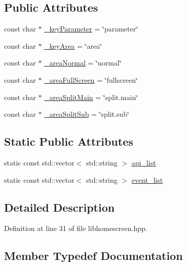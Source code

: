 \subsection*{Public Attributes}
\begin{DoxyCompactItemize}
\item 
const char $\ast$ \hyperlink{class_lib_home_screen_a927592eff8e34efbbceaf12522f8897f}{\+\_\+key\+Parameter} = \char`\"{}parameter\char`\"{}
\item 
const char $\ast$ \hyperlink{class_lib_home_screen_a8becda1b035ae45f5a11c7e7963091bf}{\+\_\+key\+Area} = \char`\"{}area\char`\"{}
\item 
const char $\ast$ \hyperlink{class_lib_home_screen_aac718b60b83c74e2b061f6f7f7ec3bf5}{\+\_\+area\+Normal} = \char`\"{}normal\char`\"{}
\item 
const char $\ast$ \hyperlink{class_lib_home_screen_ad0569f5323ead77a43bd8735377a6f25}{\+\_\+area\+Full\+Screen} = \char`\"{}fullscreen\char`\"{}
\item 
const char $\ast$ \hyperlink{class_lib_home_screen_a7f201fc366146790520bf8d990f7b2eb}{\+\_\+area\+Split\+Main} = \char`\"{}split.\+main\char`\"{}
\item 
const char $\ast$ \hyperlink{class_lib_home_screen_ab4f54373b0681de11243152f01c48888}{\+\_\+area\+Split\+Sub} = \char`\"{}split.\+sub\char`\"{}
\end{DoxyCompactItemize}
\subsection*{Static Public Attributes}
\begin{DoxyCompactItemize}
\item 
static const std\+::vector$<$ std\+::string $>$ \hyperlink{class_lib_home_screen_a5593ff5ac78f6495ccb649904cf0ab08}{api\+\_\+list}
\item 
static const std\+::vector$<$ std\+::string $>$ \hyperlink{class_lib_home_screen_a6a6d8a4d33a006a08652e7377a4c29e9}{event\+\_\+list}
\end{DoxyCompactItemize}


\subsection{Detailed Description}


Definition at line 31 of file libhomescreen.\+hpp.



\subsection{Member Typedef Documentation}
